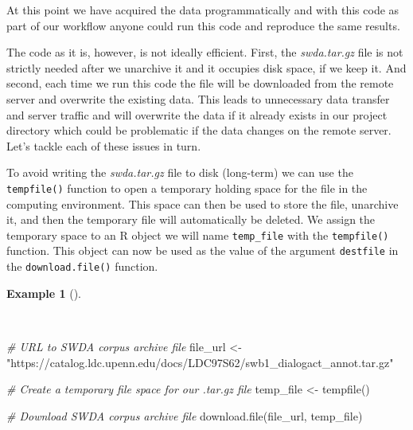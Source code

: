 \documentclass[
  letterpaper,
]{book}
\newenvironment{Shaded}{\begin{snugshade}}{\end{snugshade}}
\newcommand{\CommentTok}[1]{\textcolor[rgb]{0.00,0.00,0.00}{\textit{#1}}}
\newcommand{\FunctionTok}[1]{\textcolor[rgb]{0.00,0.00,0.00}{#1}}
\newcommand{\NormalTok}[1]{\textcolor[rgb]{0.00,0.00,0.00}{#1}}
\newcommand{\OtherTok}[1]{\textcolor[rgb]{0.00,0.00,0.00}{#1}}
\newcommand{\StringTok}[1]{\textcolor[rgb]{0.00,0.00,0.00}{#1}}
\theoremstyle{definition}
\newtheorem{example}{Example}[chapter]
\theoremstyle{remark}
\begin{document}
At this point we have acquired the data programmatically and with this
code as part of our workflow anyone could run this code and reproduce
the same results.

The code as it is, however, is not ideally efficient. First, the
\emph{swda.tar.gz} file is not strictly needed after we unarchive it and
it occupies disk space, if we keep it. And second, each time we run this
code the file will be downloaded from the remote server and overwrite
the existing data. This leads to unnecessary data transfer and server
traffic and will overwrite the data if it already exists in our project
directory which could be problematic if the data changes on the remote
server. Let's tackle each of these issues in turn.

To avoid writing the \emph{swda.tar.gz} file to disk (long-term) we can
use the \texttt{tempfile()} function to open a temporary holding space
for the file in the computing environment. This space can then be used
to store the file, unarchive it, and then the temporary file will
automatically be deleted. We assign the temporary space to an R object
we will name \texttt{temp\_file} with the \texttt{tempfile()} function.
This object can now be used as the value of the argument
\texttt{destfile} in the \texttt{download.file()} function.

\begin{example}[]\protect\hypertarget{exm-acquire-swda-temp-file}{}\label{exm-acquire-swda-temp-file}

~

\begin{Shaded}
\begin{Highlighting}[]
\CommentTok{\# URL to SWDA corpus archive file}
\NormalTok{file\_url }\OtherTok{\textless{}{-}}
  \StringTok{"https://catalog.ldc.upenn.edu/docs/LDC97S62/swb1\_dialogact\_annot.tar.gz"}

\CommentTok{\# Create a temporary file space for our .tar.gz file}
\NormalTok{temp\_file }\OtherTok{\textless{}{-}} \FunctionTok{tempfile}\NormalTok{()}

\CommentTok{\# Download SWDA corpus archive file}
\FunctionTok{download.file}\NormalTok{(file\_url, temp\_file)}
\end{Highlighting}
\end{Shaded}

\end{example}
\end{document}
